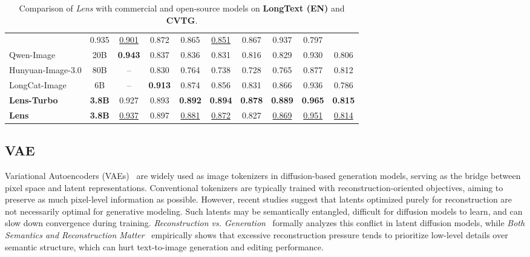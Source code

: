 \documentclass{llmxive}
\begin{document}
\begin{table}[t]
{\begin{tabular}{l|c|c|ccccccc}
      & 0.935
      & \underline{0.901} & 0.872 & 0.865 & \underline{0.851} & 0.867 & 0.937 & 0.797 \\
    Qwen-Image & 20B
      & \textbf{0.943}
      & 0.837 & 0.836 & 0.831 & 0.816 & 0.829 & 0.930 & 0.806 \\
    Hunyuan-Image-3.0 & 80B
      & --
      & 0.830 & 0.764 & 0.738 & 0.728 & 0.765 & 0.877 & 0.812 \\
    LongCat-Image & 6B
      & --
      & \textbf{0.913} & 0.874 & 0.856 & 0.831 & 0.866 & 0.936 & 0.786 \\
    \midrule
    \textbf{Lens-Turbo} & \textbf{3.8B}
      & 0.927
      & 0.893 & \textbf{0.892} & \textbf{0.894} & \textbf{0.878} & \textbf{0.889} & \textbf{0.965} & \textbf{0.815} \\
    \textbf{Lens} & \textbf{3.8B}
      & \underline{0.937}
      & 0.897 & \underline{0.881} & \underline{0.872} & 0.827 & \underline{0.869} & \underline{0.951} & \underline{0.814} \\
    \bottomrule
  \end{tabular}%
  }
\caption{Comparison of \textit{Lens} with commercial and open-source models on \textbf{LongText (EN)} and \textbf{CVTG}.}
\end{table}

\subsection{VAE}
Variational Autoencoders (VAEs)~\citep{kingma2013vae} are widely used as image tokenizers in diffusion-based generation models, serving as the bridge between pixel space and latent representations. Conventional tokenizers are typically trained with reconstruction-oriented objectives, aiming to preserve as much pixel-level information as possible. However, recent studies suggest that latents optimized purely for reconstruction are not necessarily optimal for generative modeling. Such latents may be semantically entangled, difficult for diffusion models to learn, and can slow down convergence during training. \textit{Reconstruction vs. Generation}~\citep{liu2024reconstruction} formally analyzes this conflict in latent diffusion models, while \textit{Both Semantics and Reconstruction Matter}~\citep{yang2024both} empirically shows that excessive reconstruction pressure tends to prioritize low-level details over semantic structure, which can hurt text-to-image generation and editing performance.
\end{document}
